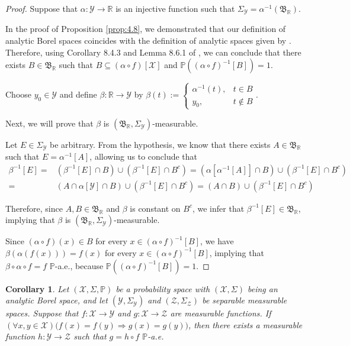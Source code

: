 \documentclass[12pt]{article}
\newtheorem{corollary}{Corollary}[section]
\begin{document}
\begin{proof}

Suppose that $\alpha:\mathcal{Y}\to \mathbb{R}$ is an injective function such that $\Sigma_\mathcal{Y}=\alpha^{-1}(\mathfrak{B}_\mathbb{R})$.

In the proof of Proposition \ref{prop:4.8}, we demonstrated that our definition of analytic Borel spaces coincides with the definition of analytic spaces given by \cite{Cohn2013}. Therefore, using Corollary 8.4.3 and Lemma 8.6.1 of \cite{Cohn2013}, we can conclude that there exists $B\in\mathfrak{B}_\mathbb{R}$ such that $B\subseteq (\alpha\circ f)[\mathcal{X}]$ and $\mathbb{P}((\alpha\circ f)^{-1}[B])=1$.

Choose $y_0\in \mathcal{Y}$ and define $\beta:\mathbb{R}\to \mathcal{Y}$ by $\beta(t):=\begin{cases}\alpha^{-1}(t),&t\in B\\y_0,&t\notin B\end{cases}$.

Next, we will prove that $\beta$ is $(\mathfrak{B}_\mathbb{R},\Sigma_\mathcal{Y})$-measurable.

Let $E\in\Sigma_\mathcal{Y}$ be arbitrary. From the hypothesis, we know that there exists $A\in\mathfrak{B}_\mathbb{R}$ such that $E=\alpha^{-1}[A]$, allowing us to conclude that 
\begin{align}
\beta^{-1}[E]=&(\beta^{-1}[E]\cap B)\cup (\beta^{-1}[E]\cap B^c)=(\alpha[\alpha^{-1}[A]]\cap B)\cup (\beta^{-1}[E]\cap B^{c})\\=&(A\cap \alpha[\mathcal{Y}]\cap B)\cup (\beta^{-1}[E]\cap B^c)=(A\cap B)\cup (\beta^{-1}[E]\cap B^c)
\end{align}

Therefore, since $A,B\in \mathfrak{B}_\mathbb{R}$ and $\beta$ is constant on $B^c$, we infer that $\beta^{-1}[E]\in \mathfrak{B}_\mathbb{R}$, implying that $\beta$ is $(\mathfrak{B}_\mathbb{R},\Sigma_\mathcal{Y})$-measurable.

Since $(\alpha\circ f)(x)\in B$ for every $x\in (\alpha\circ f)^{-1}[B]$, we have $\beta(\alpha(f(x)))=f(x)$ for every $x\in (\alpha\circ f)^{-1}[B]$, implying that $\beta\circ \alpha\circ f=f$ $\mathbb{P}$-a.e., because $\mathbb{P}((\alpha\circ f)^{-1}[B])=1$.

\end{proof}

\begin{corollary}
\label{cor_doob}
Let $(\mathcal{X},\Sigma,\mathbb{P})$ be a probability space with $(\mathcal{X},\Sigma)$ being an analytic Borel space, and let $(\mathcal{Y},\Sigma _\mathcal{Y})$ and $(\mathcal{Z},\Sigma _\mathcal{Z})$ be separable measurable spaces. Suppose that $f:\mathcal{X}\to \mathcal{Y}$ and $g:\mathcal{X}\to \mathcal{Z}$ are measurable functions. If $(\forall x,y\in \mathcal{X})\big(f(x)=f(y)\Rightarrow g(x)=g(y)\big)$, then there exists a measurable function $h:\mathcal{Y}\to \mathcal{Z}$ such that $g=h\circ f$ $\mathbb{P}$-a.e.
\end{corollary}
\end{document}
